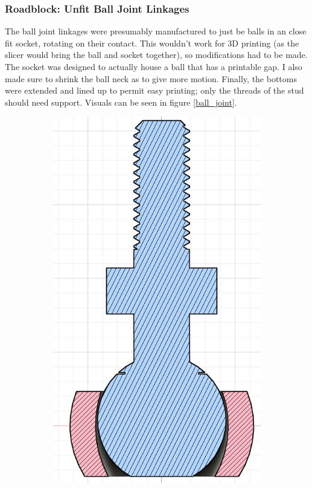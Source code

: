 \documentclass[a4paper, 10pt]{article}
\begin{document}
		\subsubsection{Roadblock: Unfit Ball Joint Linkages}
		The ball joint linkages were presumably manufactured to just be balls in an close fit socket, rotating on their contact. This wouldn't work for 3D printing (as the slicer would bring the ball and socket together), so modifications had to be made. The socket was designed to actually house a ball that has a printable gap. I also made sure to shrink the ball neck as to give more motion. Finally, the bottoms were extended and lined up to permit easy printing; only the threads of the stud should need support. Visuals can be seen in  figure \ref{ball_joint}.
		
		\begin{figure}[h]
			\centering
			\begin{subfigure}[h]{0.34\textwidth}
				\centering
				\includegraphics[width=\textwidth]{section_ball_joint}

\end{subfigure}
\end{figure}
\end{document}
